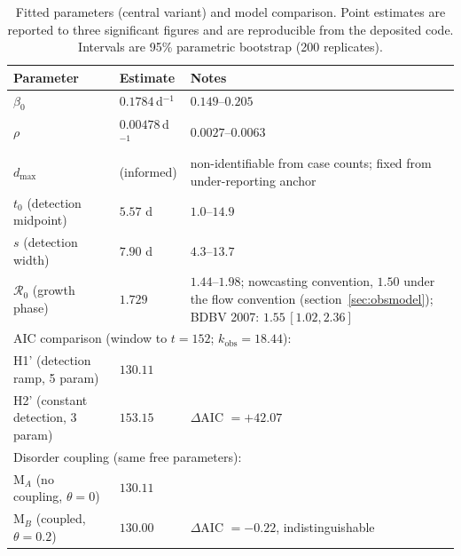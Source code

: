 \documentclass[preprint,12pt,numbers]{elsarticle}
\newcommand{\Reff}{\mathcal{R}}
\begin{document}
\begin{table}[htbp]
\centering\footnotesize
\caption{Fitted parameters (central variant) and model comparison.
Point estimates are reported to three significant figures and are
reproducible from the deposited code. Intervals are 95\% parametric
bootstrap (200 replicates).}
\label{tab:calib}
\begin{tabularx}{\textwidth}{l>{\raggedright\arraybackslash}p{}>{\raggedright\arraybackslash}X}
\toprule
Parameter & Estimate & Notes \\
\midrule
$\beta_0$ & $0.1784\,$d$^{-1}$ & $0.149$--$0.205$ \\
$\rho$ & $0.00478\,$d$^{-1}$ & $0.0027$--$0.0063$ \\
$d_{\max}$ & 0.75 (informed) & non-identifiable from case counts; fixed from under-reporting anchor \\
$t_0$ (detection midpoint) & $5.57$ d & $1.0$--$14.9$ \\
$s$ (detection width) & $7.90$ d & $4.3$--$13.7$ \\
$\Reff_0$ (growth phase) & $1.729$ & $1.44$--$1.98$; nowcasting convention, $1.50$ under the flow convention (section~\ref{sec:obsmodel}); BDBV 2007: $1.55\,[1.02,2.36]$ \cite{DePadua2026} \\
\midrule
\multicolumn{3}{l}{AIC comparison (window to $t=152$; $k_{\mathrm{obs}}=18.44$):}\\
H1' (detection ramp, 5 param) & $130.11$ & \\
H2' (constant detection, 3 param) & $153.15$ & $\Delta$AIC $=+42.07$ \\
\multicolumn{3}{l}{Disorder coupling (same free parameters):}\\
M$_A$ (no coupling, $\theta=0$) & $130.11$ & \\
M$_B$ (coupled, $\theta=0.2$) & $130.00$ & $\Delta$AIC $=-0.22$, indistinguishable \\
\bottomrule
\end{tabularx}
\end{table}
\end{document}
